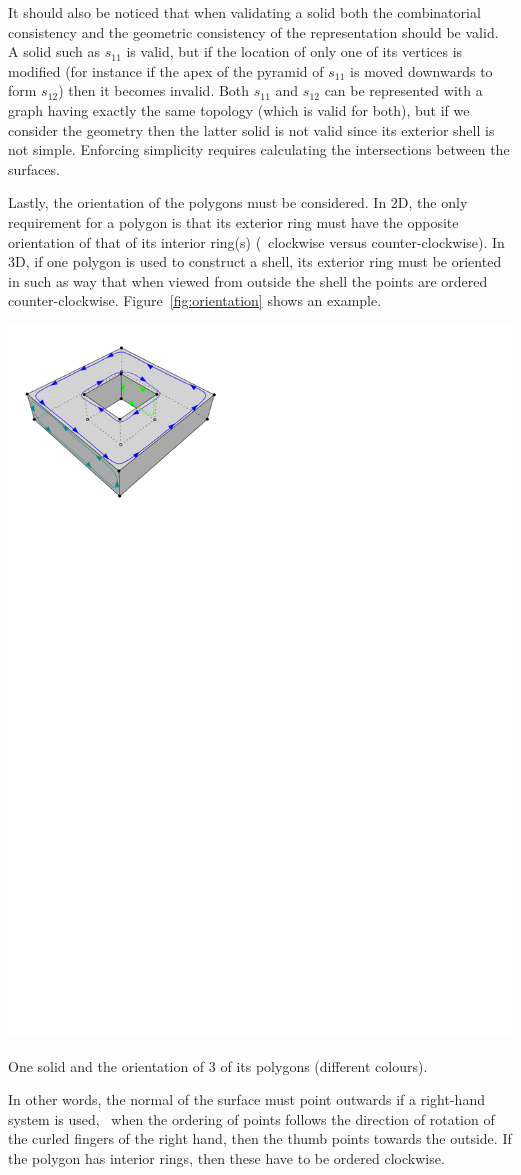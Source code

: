 It should also be noticed that when validating a solid both the combinatorial consistency and the geometric consistency of the representation should be valid.
A solid such as $s_{11}$ is valid, but if the location of only one of its vertices is modified (for instance if the apex of the pyramid of $s_{11}$ is moved downwards to form $s_{12}$) then it becomes invalid. 
Both $s_{11}$ and $s_{12}$ can be represented with a graph having exactly the same topology (which is valid for both), but if we consider the geometry then the latter solid is not valid since its exterior shell is not simple.
Enforcing simplicity requires calculating the intersections between the surfaces.

Lastly, the orientation of the polygons must be considered.
In 2D, the only requirement for a polygon is that its exterior ring must have the opposite orientation of that of its interior ring(s) (\eg\ clockwise versus counter-clockwise).
In 3D, if one polygon is used to construct a shell, its exterior ring must be oriented in such as way that when viewed from outside the shell the points are ordered counter-clockwise.
Figure~\ref{fig:orientation} shows an example.
\begin{marginfigure}
  \centering
  \includegraphics[width=0.8\linewidth]{figs/orientation.pdf}
  \caption{One solid and the orientation of 3 of its polygons (different colours).}%
\label{fig:orientation}
\end{marginfigure}
In other words, the normal of the surface must point outwards if a right-hand system is used, \ie\ when the ordering of points follows the direction of rotation of the curled fingers of the right hand, then the thumb points towards the outside.
If the polygon has interior rings, then these have to be ordered clockwise.


